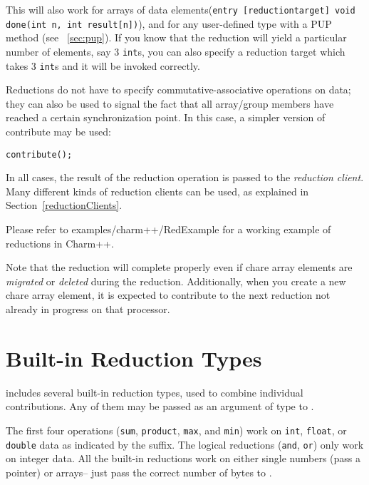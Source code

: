 This will also work for arrays of data 
elements({\tt entry [reductiontarget] void done(int n, int result[n])}), 
and for any user-defined type with a PUP method
(see ~\ref{sec:pup}). If you know that the reduction will yield a particular
number of elements, say 3 {\tt int}s, you can also specify a reduction target which
takes 3 {\tt int}s and it will be invoked correctly. 

Reductions do not have to specify commutative-associative operations on data;
they can also be used to signal the fact that all array/group members
have reached a certain synchronization point. In this case, a simpler version
of contribute may be used:


\begin{alltt}
    contribute();
\end{alltt}

In all cases, the result of the reduction operation is passed to the {\em reduction
client}.  Many different kinds of reduction clients can be used, as
explained in Section~\ref{reductionClients}.

Please refer to examples/charm++/RedExample for a working example of
reductions in Charm++.

Note that the reduction will complete properly even if chare array elements are {\em migrated}
or {\em deleted} during the reduction. Additionally, when you create a new chare array element, 
it is expected to contribute to the next reduction not already in progress on that
processor. 

\section{Built-in Reduction Types}
\label{builtin_reduction}

\charmpp{} includes several built-in reduction types, used to combine 
individual contributions.  Any of them may be passed as an argument of type
 to .

The first four operations ({\tt sum}, {\tt product}, {\tt max}, and {\tt min}) work on {\tt int},
{\tt float}, or {\tt double} data as indicated by the suffix.  The logical
reductions ({\tt and}, {\tt or}) only work on integer data.  All the built-in
reductions work on either single numbers (pass a pointer) or arrays-- just
pass the correct number of bytes to .

